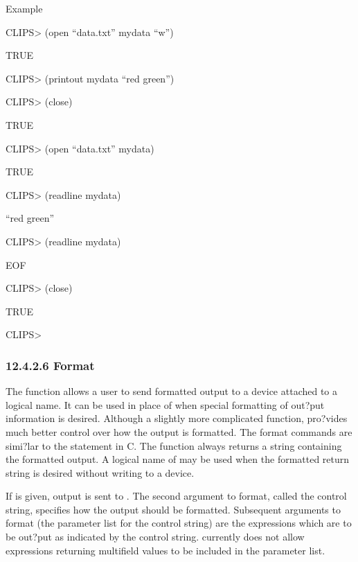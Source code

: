 \documentclass[letterpaper,10pt,english]{sphinxmanual}
\begin{document}
Example

CLIPS\textgreater{} (open “data.txt” mydata “w”)

TRUE

CLIPS\textgreater{} (printout mydata “red green”)

CLIPS\textgreater{} (close)

TRUE

CLIPS\textgreater{} (open “data.txt” mydata)

TRUE

CLIPS\textgreater{} (readline mydata)

“red green”

CLIPS\textgreater{} (readline mydata)

EOF

CLIPS\textgreater{} (close)

TRUE

CLIPS\textgreater{}


\subsubsection{12.4.2.6 Format}
\label{\detokenize{actions:format}}
The  function allows a user to send formatted output to a
device attached to a logical name. It can be used in place of
 when special formatting of out?put information is desired.
Although a slightly more complicated function,  pro?vides much
better control over how the output is formatted. The format commands are
simi?lar to the  statement in C. The  function
always returns a string containing the formatted output. A logical name
of  may be used when the formatted return string is desired
without writing to a device.


\begin{sphinxVerbatim}[commandchars=\\\{\}]
   
\end{sphinxVerbatim}

If  is given, output is sent to . The second argument to
format, called the control string, specifies how the output should be
formatted. Subsequent arguments to format (the parameter list for the
control string) are the expressions which are to be out?put as indicated
by the control string.  currently does not allow expressions
returning multifield values to be included in the parameter list.
\end{document}
